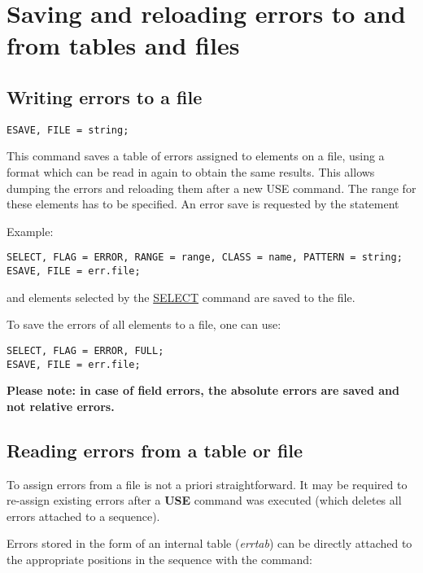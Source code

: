 
\section{Saving and reloading errors to and from tables and files} %

\subsection{Writing errors to a file}

\begin{verbatim}
ESAVE, FILE = string;
\end{verbatim}

This command saves a table of errors assigned to elements on a file,
using a format which can be read in again to obtain the same
results. This allows dumping the errors and reloading them after a new
USE command. The range for these elements has to be specified. An error
save is requested by the statement  

Example: 
\begin{verbatim}
SELECT, FLAG = ERROR, RANGE = range, CLASS = name, PATTERN = string;
ESAVE, FILE = err.file;
\end{verbatim} 
and elements selected by the  \href{../Introduction/select.html}{SELECT}
command are saved to the file.  


To save the errors of all elements to a file, one can use: 
\begin{verbatim}
SELECT, FLAG = ERROR, FULL;                                    
ESAVE, FILE = err.file;
\end{verbatim}

{\bf Please note: in case of field errors, the absolute errors are
  saved and not relative errors. } 

\subsection{Reading errors from a table or file}

To assign errors from a file is not a priori straightforward. It may be
required to re-assign existing errors after a \textbf{USE} command was
executed (which deletes all errors attached to a sequence).  

Errors stored in the form of an internal table (\textit{errtab}) can  be
directly attached to the appropriate positions in the sequence with the
command:  

